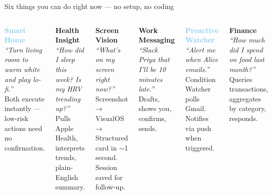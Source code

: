 \documentclass[aspectratio=169, 10pt]{beamer}
\begin{document}
\begin{frame}{Six things you can do right now — no setup, no coding}
  \begin{columns}[T]
      \small
      \textcolor{skyblue}{\textbf{\faHome\; Smart Home}}\\
      {\color{dimcol}\textit{``Turn living room to warm white and play lo-fi.''}\\
      Both execute instantly — low-risk actions need no confirmation.}

      \vspace{0.7em}
      \textcolor{greencol}{\textbf{\faHeartbeat\; Health Insight}}\\
      {\color{dimcol}\textit{``How did I sleep this week? Is my HRV trending up?''}\\
      Pulls Apple Health, interprets trends, plain-English summary.}

      \vspace{0.7em}
      \textcolor{indigocol}{\textbf{\faCamera\; Screen Vision}}\\
      {\color{dimcol}\textit{``What's on my screen right now?''}\\
      Screenshot → VisualOS → Structured card in $\sim$1 second. Session saved for follow-up.}

      \small
      \textcolor{ambercol}{\textbf{\faSlack\; Work Messaging}}\\
      {\color{dimcol}\textit{``Slack Priya that I'll be 10 minutes late.''}\\
      Drafts, shows you, confirms, sends.}

      \vspace{0.7em}
      \textcolor{skyblue}{\textbf{\faBell\; Proactive Watcher}}\\
      {\color{dimcol}\textit{``Alert me when Alice emails.''}\\
      Condition Watcher polls Gmail. Notifies via push when triggered.}

      \vspace{0.7em}
      \textcolor{greencol}{\textbf{\faChartBar\; Finance}}\\
      {\color{dimcol}\textit{``How much did I spend on food last month?''}\\
      Queries transactions, aggregates by category, responds.}
  \end{columns}
\end{frame}
\end{document}
